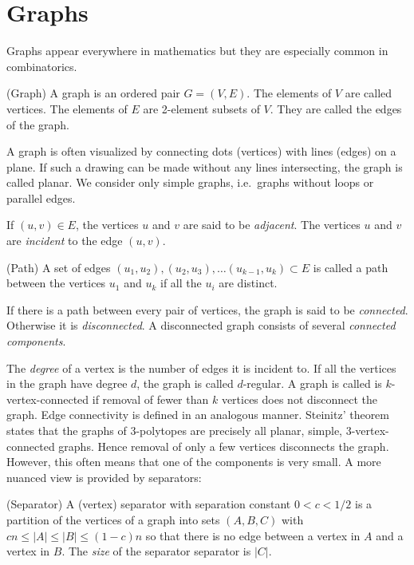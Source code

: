\section{Graphs}

Graphs appear everywhere in mathematics but they are especially common in 
combinatorics. 

\begin{definition}
(Graph) A graph is an ordered pair $G=(V,E)$. The elements of $V$ are called 
vertices. The elements of $E$ are 2-element subsets of $V$. They are called 
the edges of the graph. 
\end{definition}
A graph is often visualized by connecting dots (vertices) with lines (edges) on a plane. 
If such a drawing can be made without any lines intersecting, the graph is called
planar.
We consider only simple graphs, i.e.\ graphs without loops or parallel 
edges.

If $(u,v) \in E$, the vertices $u$ and $v$ are said to be \textit{adjacent}. 
The vertices $u$ and $v$ are \textit{incident} to the edge $(u,v)$. 
\begin{definition}
 (Path) A set of edges $(u_1, u_2), (u_2, u_3), \dots (u_{k-1}, u_k) \subset E$ 
is called a path between the vertices $u_1$ and $u_k$ if all the $u_i$ are 
distinct.
\end{definition}
If there is a path between every pair of vertices, the graph is said to be 
\textit{connected}. Otherwise it is \textit{disconnected}. A disconnected graph 
consists of several \textit{connected components}.

The \textit{degree} of a vertex is the number of edges it is incident to. 
If all the vertices in the graph have degree $d$, the graph is called 
$d$-regular. A graph is called is $k$-vertex-connected if removal of fewer than 
$k$ vertices does not disconnect the graph. Edge connectivity is defined in an 
analogous manner. Steinitz' theorem states that the graphs of 
3-polytopes are precisely all planar, simple, 3-vertex-connected graphs. Hence 
removal of only a few vertices disconnects the graph. However, this
often means that one of the components is very small. A more nuanced view is 
provided 
by separators:

\begin{definition}
(Separator) A (vertex) separator with separation constant $0<c<1/2$ is a 
partition of the vertices of a graph into 
sets $(A,B,C)$  with $cn \le |A| \le |B| \le (1-c)n$ so that there is no edge between 
a vertex in $A$ and a vertex in $B$. The \textit{size} of the separator
separator is $|C|$.  
\end{definition}

